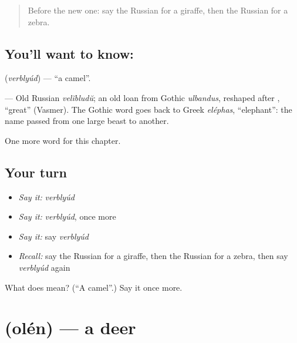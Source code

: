 \label{lesson:RU-C225-verblyud}



\begin{quote}
Before the new one: say the Russian for a giraffe, then the Russian for a zebra.
\end{quote}

\subsection*{You'll want to know: }
\textbf{} (\emph{verblyúd}) — \textquotedblleft{}a camel\textquotedblright{}.

\begin{cousinweb}
\textbf{} — Old Russian \emph{velĭbludŭ}; an old loan from Gothic \emph{ulbandus}, reshaped after \emph{}, \textquotedblleft{}great\textquotedblright{} (Vasmer). The Gothic word goes back to Greek \emph{eléphas}, \textquotedblleft{}elephant\textquotedblright{}: the name passed from one large beast to another.
\end{cousinweb}

\begin{grammarlens}[title={What you've built}]
One more word for this chapter.
\end{grammarlens}

\subsection*{Your turn}
\begin{itemize}
\raggedright
  \item \emph{Say it:} \emph{verblyúd}
  \item \emph{Say it:} \emph{verblyúd}, once more
  \item \emph{Say it:} say \emph{verblyúd}
  \item \emph{Recall:} say the Russian for a giraffe, then the Russian for a zebra, then say \emph{verblyúd} again
\end{itemize}

\begin{tcolorbox}[breakable,colback=teal!4,colframe=teal!35!black,title={Before you move on}]
What does  mean? (\textquotedblleft{}A camel\textquotedblright{}.) Say it once more.
\end{tcolorbox}
\section[\texorpdfstring{\ru{олень} (olén)}{олень (olén)}]{ (olén) — a deer}

